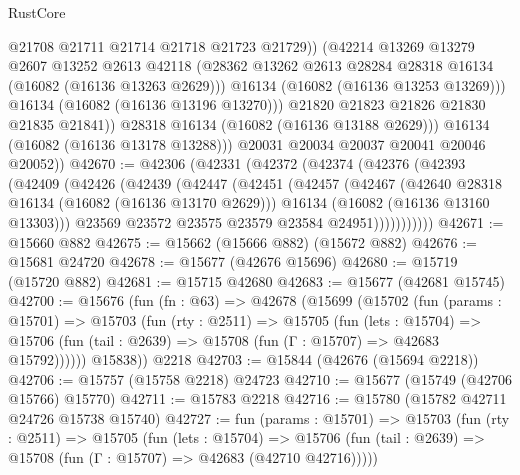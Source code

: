 \begin{lexlean}{RustCore}
\begin{coremodule}
                      @21708
                      @21711
                      @21714
                      @21718
                      @21723
                      @21729))
                  (@42214
                    @13269
                    @13279
                    @2607
                    @13252
                    @2613
                    @42118
                    (@28362 @13262 @2613 @28284 @28318 @16134 (@16082 (@16136 @13263 @2629)))
                    @16134
                    (@16082 (@16136 @13253 @13269)))
                  @16134
                  (@16082 (@16136 @13196 @13270)))
                @21820
                @21823
                @21826
                @21830
                @21835
                @21841))
            @28318
            @16134
            (@16082 (@16136 @13188 @2629)))
          @16134
          (@16082 (@16136 @13178 @13288)))
        @20031
        @20034
        @20037
        @20041
        @20046
        @20052))
@42670 := @42306
    (@42331
      (@42372
        (@42374
          (@42376
            (@42393
              (@42409
                (@42426
                  (@42439
                    (@42447
                      (@42451
                        (@42457
                          (@42467
                            (@42640 @28318 @16134 (@16082 (@16136 @13170 @2629)))
                            @16134
                            (@16082 (@16136 @13160 @13303)))
                          @23569
                          @23572
                          @23575
                          @23579
                          @23584
                          @24951)))))))))))
@42671 := @15660 @882
@42675 := @15662 (@15666 @882) (@15672 @882)
@42676 := @15681 @24720
@42678 := @15677 (@42676 @15696)
@42680 := @15719 (@15720 @882)
@42681 := @15715 @42680
@42683 := @15677 (@42681 @15745)
@42700 := @15676
    (fun (fn : @63) =>
    @42678
      (@15699
        (@15702
          (fun (params : @15701) =>
          @15703
            (fun (rty : @2511) =>
            @15705
              (fun (lets : @15704) =>
              @15706 (fun (tail : @2639) => @15708 (fun (Γ : @15707) => @42683 @15792))))))
        @15838))
    @2218
@42703 := @15844 (@42676 (@15694 @2218))
@42706 := @15757 (@15758 @2218) @24723
@42710 := @15677 (@15749 (@42706 @15766) @15770)
@42711 := @15783 @2218
@42716 := @15780 (@15782 @42711 @24726 @15738 @15740)
@42727 := fun (params : @15701) =>
  @15703
    (fun (rty : @2511) =>
    @15705
      (fun (lets : @15704) =>
      @15706 (fun (tail : @2639) => @15708 (fun (Γ : @15707) => @42683 (@42710 @42716)))))

\end{coremodule}
\end{lexlean}
